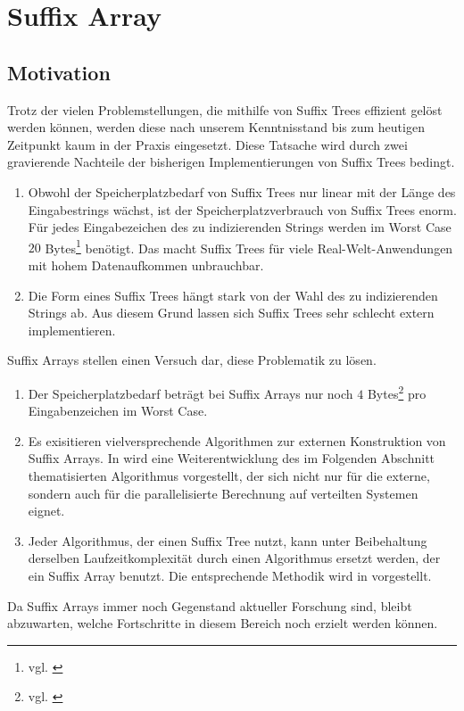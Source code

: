 \documentclass[12pt]{report}
\begin{document}
\chapter{Suffix Array}
\label{sec:SuffixArray}

\section{Motivation}
\label{sec:Motivation}

Trotz der vielen Problemstellungen, die mithilfe von Suffix Trees effizient gelöst werden können, werden diese nach unserem Kenntnisstand bis zum heutigen Zeitpunkt kaum in der Praxis eingesetzt. Diese Tatsache wird durch zwei gravierende Nachteile der bisherigen Implementierungen von Suffix Trees bedingt.
\begin{enumerate}
    \item Obwohl der Speicherplatzbedarf von Suffix Trees nur linear mit der Länge des Eingabestrings wächst, ist der Speicherplatzverbrauch von Suffix Trees enorm. Für jedes Eingabezeichen des zu indizierenden Strings werden im Worst Case $20$ Bytes\footnote{vgl. \cite{Giegerich1999}} benötigt. Das macht Suffix Trees für viele Real-Welt-Anwendungen mit hohem Datenaufkommen unbrauchbar.
    \item Die Form eines Suffix Trees hängt stark von der Wahl des zu indizierenden Strings ab. Aus diesem Grund lassen sich Suffix Trees sehr schlecht extern implementieren.
\end{enumerate}
Suffix Arrays stellen einen Versuch dar, diese Problematik zu lösen.
\begin{enumerate}
    \item Der Speicherplatzbedarf beträgt bei Suffix Arrays nur noch $4$ Bytes\footnote{vgl. \cite{Abouelhoda2004}} pro Eingabenzeichen im Worst Case.
    \item Es exisitieren vielversprechende Algorithmen zur externen Konstruktion von Suffix Arrays. In \cite{Dementiev2008} wird eine Weiterentwicklung des im Folgenden Abschnitt thematisierten Algorithmus vorgestellt, der sich nicht nur für die externe, sondern auch für die parallelisierte Berechnung auf verteilten Systemen eignet.
    \item Jeder Algorithmus, der einen Suffix Tree nutzt, kann unter Beibehaltung derselben Laufzeitkomplexität durch einen Algorithmus ersetzt werden, der ein Suffix Array benutzt. Die entsprechende Methodik wird in \cite{Abouelhoda2004} vorgestellt.
\end{enumerate}
Da Suffix Arrays immer noch Gegenstand aktueller Forschung sind, bleibt abzuwarten, welche Fortschritte in diesem Bereich noch erzielt werden können.
\end{document}
